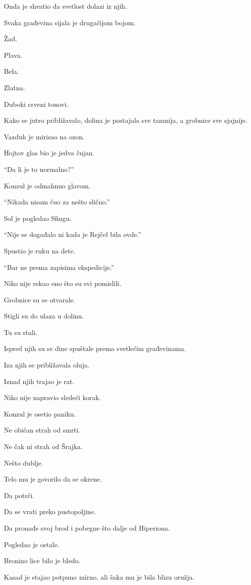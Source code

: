 Onda je shvatio da svetlost dolazi iz njih.

Svaka građevina sijala je drugačijom bojom.

Žad.

Plava.

Bela.

Zlatna.

Duboki crveni tonovi.

Kako se jutro približavalo, dolina je postajala sve tamnija, a grobnice sve sjajnije.

Vazduh je mirisao na ozon.

Hojtov glas bio je jedva čujan.

``Da li je to normalno?''

Konzul je odmahnuo glavom.

``Nikada nisam čuo za nešto slično.''

Sol je pogledao Sfingu.

``Nije se događalo ni kada je Rejčel bila ovde.''

Spustio je ruku na dete.

``Bar ne prema zapisima ekspedicije.''

Niko nije rekao ono što su svi pomislili.

Grobnice su se otvarale.

\bigskip

Stigli su do ulaza u dolinu.

Tu su stali.

Ispred njih su se dine spuštale prema svetlećim građevinama.

Iza njih se približavala oluja.

Iznad njih trajao je rat.

Niko nije napravio sledeći korak.

Konzul je osetio paniku.

Ne običan strah od smrti.

Ne čak ni strah od Šrajka.

Nešto dublje.

Telo mu je govorilo da se okrene.

Da potrči.

Da se vrati preko pustopoljine.

Da pronađe svoj brod i pobegne što dalje od Hiperiona.

Pogledao je ostale.

Bronino lice bilo je bledo.

Kasad je stajao potpuno mirno, ali šaka mu je bila blizu oružja.

